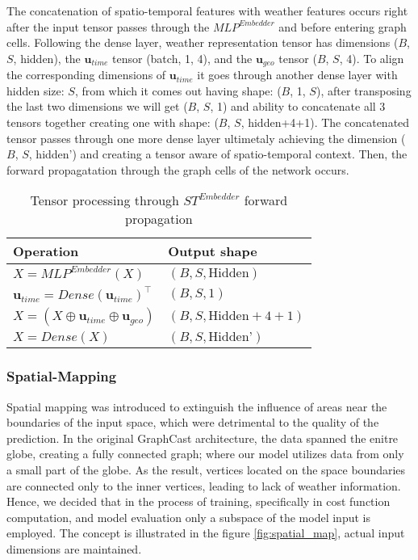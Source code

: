 \noindent The concatenation of spatio-temporal features with weather features occurs right after the input tensor passes through the $MLP^{Embedder}$ and before entering graph cells. Following the dense layer, weather representation tensor has dimensions ($B$, $S$, hidden), the $\mathbf{u}_{time}$ tensor (batch, 1, 4), and the $\mathbf{u}_{geo}$ tensor ($B$, $S$, 4). To align the corresponding dimensions of $\mathbf{u}_{time}$ it goes through another dense layer with hidden size: $S$, from which it comes out having shape: ($B$, 1, $S$), after transposing the last two dimensions we will get ($B$, $S$, 1) and ability to concatenate all 3 tensors together creating one with shape: ($B$, $S$, hidden+4+1). The concatenated tensor passes through one more dense layer ultimetaly achieving the dimension ($B$, $S$, hidden') and creating a tensor aware of spatio-temporal context. Then, the forward propagatation through the graph cells of the network occurs.

\begin{table}[!ht]
    \centering
    \begin{tabular}{|l|l|}
        \hline
        \textbf{Operation} & \textbf{Output shape} \\
        \hline
        $X = MLP^{Embedder}(X)$ & $(B, S, \text{Hidden})$ \\
        $\mathbf{u}_{time} = Dense(\mathbf{u}_{time})^{\top}$ & $(B, S, 1)$ \\
        $X = (X \oplus \mathbf{u}_{time} \oplus \mathbf{u}_{geo})$ & $(B, S, \text{Hidden} + 4 + 1)$ \\
        $X = Dense(X)$ & $(B, S, \text{Hidden'})$ \\
        \hline
    \end{tabular}
    \caption{Tensor processing through $ST^{Embedder}$ forward propagation  }
    \label{tab:st_embed}
\end{table}

\subsubsection{Spatial-Mapping}
Spatial mapping was introduced to extinguish the influence of areas near the boundaries of the input space, which were detrimental to the quality of the prediction. In the original GraphCast architecture, the data spanned the enitre globe, creating a fully connected graph; where our model utilizes data from only a small part of the globe. As the result, vertices located on the space boundaries are connected only to the inner vertices, leading to lack of weather information. Hence, we decided that in the process of training, specifically in cost function computation, and model evaluation only a subspace of the model input is employed. The concept is illustrated in the figure \ref{fig:spatial_map}, actual input dimensions are maintained.


 